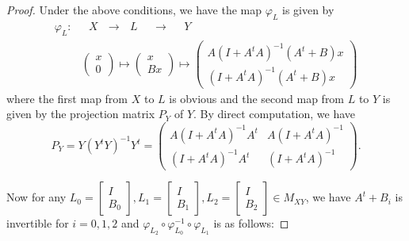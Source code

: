 \documentclass[10pt,a4paper]{amsart}
\begin{document}
\begin{proof}
Under the above conditions, we have the map $\varphi_{L}$ is given by
\begin{align*}
\varphi_{L} : & ~  ~   ~ X  ~  ~   ~ \longrightarrow  ~  ~   ~ L  ~  ~   ~ ~  ~   ~\longrightarrow ~  ~   ~ ~  ~   ~ Y\\
 ~ ~ & \left(
\begin{array}{cc}
x \\
0 \end{array} \right) \mapsto  \left(
\begin{array}{cc}
x \\
Bx \end{array} \right) \mapsto  \left(
\begin{array}{cc}
A(I+A^tA)^{-1}(A^t+B)x \\
(I+A^tA)^{-1}(A^t+B)x \end{array} \right)
\end{align*}
where the first map from $X$ to $L$ is obvious and the second map from $L$ to $Y$ is given by the projection matrix $P_Y$ of $Y$. By direct computation, we have
\[
P_Y=Y(Y^tY)^{-1}Y^t=\left(
\begin{array}{cc}
A(I+A^tA)^{-1}A^t & A(I+A^tA)^{-1}\\
(I+A^tA)^{-1}A^t & (I+A^tA)^{-1}\end{array} \right).
\]

Now for any  $L_0=\left[
\begin{array}{cc}
I \\
B_0 \end{array} \right], L_1=\left[
\begin{array}{cc}
I \\
B_1 \end{array} \right], L_2=\left[
\begin{array}{cc}
I \\
B_2 \end{array} \right] \in M_{XY}$, we have $A^t+B_i$ is invertible for $i=0,1,2$ and $\varphi_{L_2}\circ \varphi_{L_0}^{-1}\circ \varphi_{L_1}$ is as follows:



\end{proof}
\end{document}
